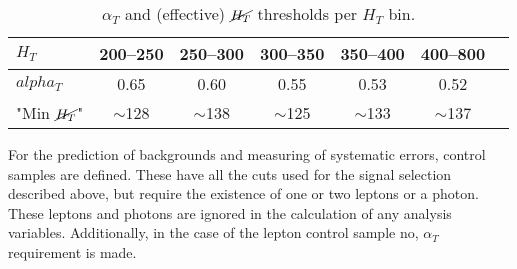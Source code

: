 \begin{table}[h!]
  \caption{$\alpha_T$ and (effective) $\cancel{H_T}$ thresholds per $H_T$ bin.\label{tab:alphat-thresholds}}
  \centering
  \footnotesize
  \begin{tabular}{ lcccccc }
    \hline
    \hline
    $H_T$     & 200--250   & 250--300   & 300--350  & 350--400  & 400--800 \\ %
    \hline                                                                     
    $alpha_T$      & 0.65       & 0.60       & 0.55      & 0.53      & 0.52     \\  %
    "Min $\cancel{H_T}$"   & $\sim$128  & $\sim$138  & $\sim$125 & $\sim$133 & $\sim$137 \\  %
    \hline
    \hline
  \end{tabular}
\end{table}

\noindent For the prediction of backgrounds and measuring of systematic errors, control samples are defined. These have all the cuts used for the signal selection described above, but require the existence of one or two leptons or a photon. These leptons and photons are ignored in the calculation of any analysis variables. Additionally, in the case of the lepton control sample no, $\alpha_T$ requirement is made.